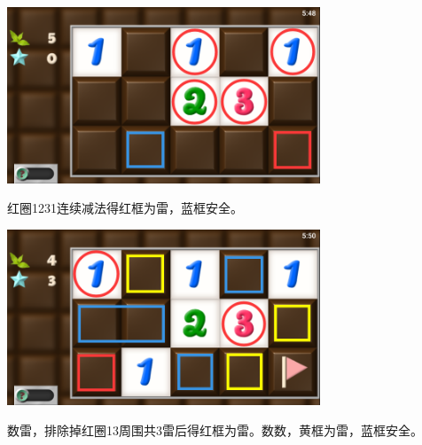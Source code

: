 \subsection{} %
\begin{center}
    \includegraphics[width=0.7\textwidth]{puzzle/65-1.png}
\end{center}
红圈1231连续减法得红框为雷，蓝框安全。
\begin{center}
    \includegraphics[width=0.7\textwidth]{puzzle/65-2.png}
\end{center}
数雷，排除掉红圈13周围共3雷后得红框为雷。数数，黄框为雷，蓝框安全。


